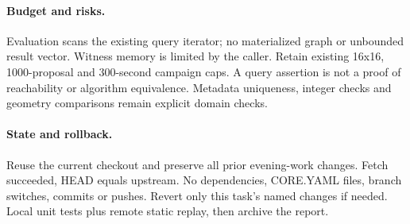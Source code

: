 \documentclass[11pt,a4paper]{article}
\begin{document}
\paragraph{Budget and risks.} Evaluation scans the existing query iterator; no
materialized graph or unbounded result vector. Witness memory is limited by the
caller. Retain existing 16x16, 1000-proposal and 300-second campaign caps. A query
assertion is not a proof of reachability or algorithm equivalence. Metadata
uniqueness, integer checks and geometry comparisons remain explicit domain checks.
\paragraph{State and rollback.} Reuse the current checkout and preserve all prior
evening-work changes. Fetch succeeded, HEAD equals upstream. No dependencies,
CORE.YAML files, branch switches, commits or pushes. Revert only this task's named
changes if needed. Local unit tests plus remote static replay, then archive the report.
\begin{center}\end{center}
\end{document}
